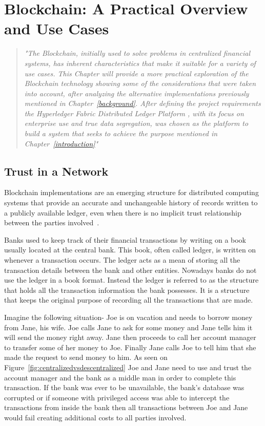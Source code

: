 \chapter{Blockchain: A Practical Overview and Use Cases}

\begin{quote} \emph{"The Blockchain, initially used to solve problems in
  centralized financial systems, has inherent characteristics that make it
  suitable for a variety of use cases. This Chapter will provide a more
  practical exploration of the Blockchain technology showing some of the
  considerations that were taken into account, after analyzing the alternative
  implementations previously mentioned in Chapter~\ref{background}. After
  defining the project requirements the Hyperledger Fabric Distributed Ledger
  Platform , with its focus on enterprise use and true data segregation, was
  chosen as the platform to build a system that seeks to achieve the purpose
  mentioned in Chapter~\ref{introduction}"} 
\end{quote}

\section{Trust in a Network}

Blockchain implementations are an emerging structure for distributed computing
systems that provide an accurate and unchangeable history of records written to
a publicly available ledger, even when there is no implicit trust relationship
between the parties involved~\cite{Barclay2017}.

Banks used to keep track of their financial transactions by writing on a book
usually located at the central bank. This book, often called ledger, is written
on whenever a transaction occurs. The ledger acts as a mean of storing all the
transaction details between the bank and other entities. Nowadays banks do not
use the ledger in a book format. Instead the ledger is referred to as the
structure that holds all the transaction information the bank possesses. It is
a structure that keeps the original purpose of recording all the transactions
that are made.

Imagine the following situation- Joe is on vacation and needs to borrow money
from Jane, his wife. Joe calls Jane to ask for some money and Jane tells him it
will send the money right away. Jane then proceeds to call her account manager
to transfer some of her money to Joe. Finally Jane calls Joe to tell him that
she made the request to send money to him.  As seen on
Figure~\ref{fig:centralizedvsdescentralized} Joe and Jane need to use and trust
the account manager and the bank as a middle man in order to complete this
transaction. If the bank was ever to be unavailable, the bank's database was
corrupted or if someone with  privileged access was able to intercept the
transactions from inside the bank then all transactions between Joe and Jane
would fail creating additional costs to all parties involved. 


